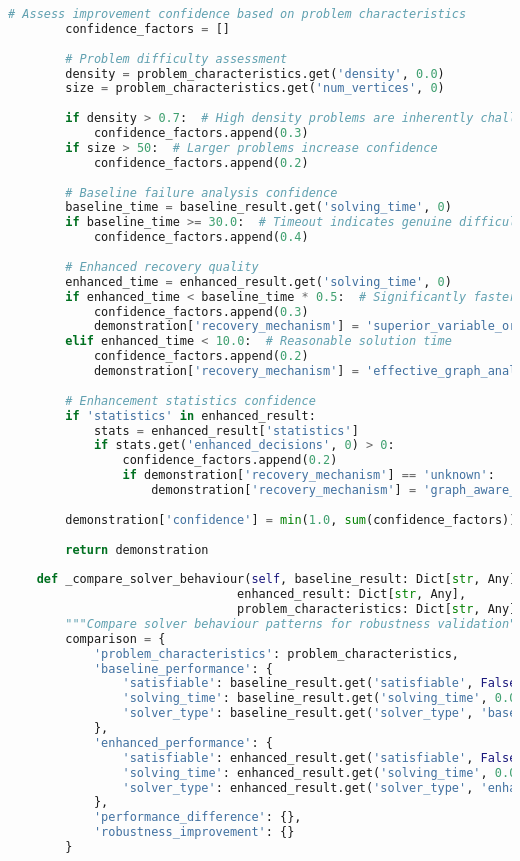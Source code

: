 \begin{lstlisting}[language=Python, caption=Systematic Failure Mode Analysis and Recovery Validation]
        # Assess improvement confidence based on problem characteristics
        confidence_factors = []
        
        # Problem difficulty assessment
        density = problem_characteristics.get('density', 0.0)
        size = problem_characteristics.get('num_vertices', 0)
        
        if density > 0.7:  # High density problems are inherently challenging
            confidence_factors.append(0.3)
        if size > 50:  # Larger problems increase confidence
            confidence_factors.append(0.2)
        
        # Baseline failure analysis confidence
        baseline_time = baseline_result.get('solving_time', 0)
        if baseline_time >= 30.0:  # Timeout indicates genuine difficulty
            confidence_factors.append(0.4)
        
        # Enhanced recovery quality
        enhanced_time = enhanced_result.get('solving_time', 0)
        if enhanced_time < baseline_time * 0.5:  # Significantly faster solution
            confidence_factors.append(0.3)
            demonstration['recovery_mechanism'] = 'superior_variable_ordering'
        elif enhanced_time < 10.0:  # Reasonable solution time
            confidence_factors.append(0.2)
            demonstration['recovery_mechanism'] = 'effective_graph_analysis'
        
        # Enhancement statistics confidence
        if 'statistics' in enhanced_result:
            stats = enhanced_result['statistics']
            if stats.get('enhanced_decisions', 0) > 0:
                confidence_factors.append(0.2)
                if demonstration['recovery_mechanism'] == 'unknown':
                    demonstration['recovery_mechanism'] = 'graph_aware_decisions'
        
        demonstration['confidence'] = min(1.0, sum(confidence_factors))
        
        return demonstration
    
    def _compare_solver_behaviour(self, baseline_result: Dict[str, Any],
                                enhanced_result: Dict[str, Any],
                                problem_characteristics: Dict[str, Any]) -> Dict[str, Any]:
        """Compare solver behaviour patterns for robustness validation"""
        comparison = {
            'problem_characteristics': problem_characteristics,
            'baseline_performance': {
                'satisfiable': baseline_result.get('satisfiable', False),
                'solving_time': baseline_result.get('solving_time', 0.0),
                'solver_type': baseline_result.get('solver_type', 'baseline')
            },
            'enhanced_performance': {
                'satisfiable': enhanced_result.get('satisfiable', False),
                'solving_time': enhanced_result.get('solving_time', 0.0),
                'solver_type': enhanced_result.get('solver_type', 'enhanced')
            },
            'performance_difference': {},
            'robustness_improvement': {}
        }
        

\end{lstlisting}
